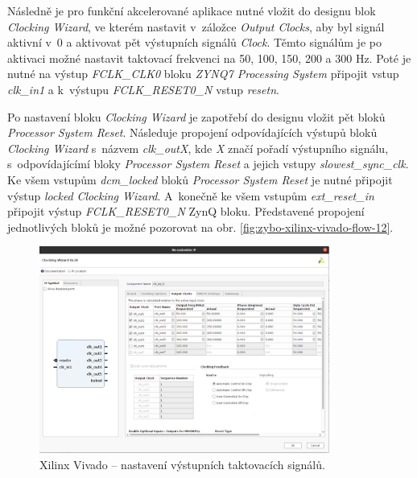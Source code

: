 \documentclass[a4paper, twoside, 11pt]{article}
\begin{document}
\begin{appendices}
		Následně je pro funkční akcelerované aplikace nutné vložit do designu blok \textit{Clocking Wizard}, ve kterém nastavit v~záložce \textit{Output Clocks}, aby byl signál aktivní v~0 a aktivovat pět výstupních signálů \textit{Clock}. Těmto signálům je po aktivaci možné nastavit taktovací frekvenci na 50, 100, 150, 200 a 300 Hz. Poté je nutné na výstup \textit{FCLK\_CLK0} bloku \textit{ZYNQ7 Processing System} připojit vstup \textit{clk\_in1} a k~výstupu \textit{FCLK\_RESET0\_N} vstup \textit{resetn}.\par
		Po nastavení bloku \textit{Clocking Wizard} je zapotřebí do designu vložit pět bloků \textit{Processor System Reset}. Následuje propojení odpovídajících výstupů bloků \textit{Clocking Wizard} s~názvem \textit{clk\_outX}, kde \textit{X} značí pořadí výstupního signálu, s~odpovídajícímí bloky \textit{Processor System Reset} a jejich vstupy \textit{slowest\_sync\_clk}. Ke všem vstupům \textit{dcm\_locked} bloků \textit{Processor System Reset} je nutné připojit výstup \textit{locked} \textit{Clocking Wizard}. A~konečně ke všem vstupům \textit{ext\_reset\_in} připojit výstup \textit{FCLK\_RESET0\_N} ZynQ bloku. Představené propojení jednotlivých bloků je možné pozorovat na obr. \ref{fig:zybo-xilinx-vivado-flow-12}.

		\begin{figure}[htbp!]
			\centering
			\includegraphics[width=0.85\textwidth]{src/png/zybo-xilinx-vivado-flow/zybo-xilinx-vivado-flow-36.jpg}
			\caption{Xilinx Vivado – nastavení výstupních taktovacích signálů.}
			\label{fig:zybo-xilinx-vivado-flow-36}
		\end{figure}


\end{appendices}
\end{document}
